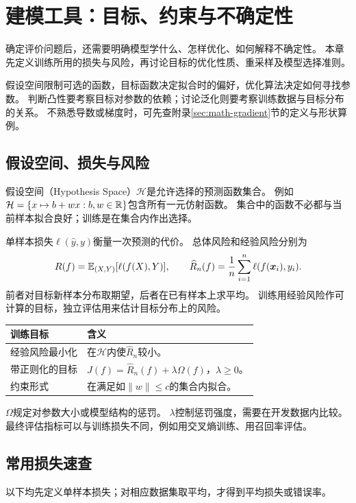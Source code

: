 \chapter{建模工具：目标、约束与不确定性}
\label{ch:tools}

确定评价问题后，还需要明确模型学什么、怎样优化、如何解释不确定性。
本章先定义训练所用的损失与风险，再讨论目标的优化性质、重采样及模型选择准则。

\begin{keyidea}[三个层次]
假设空间限制可选的函数，目标函数决定拟合时的偏好，优化算法决定如何寻找参数。
判断凸性要考察目标对参数的依赖；讨论泛化则要考察训练数据与目标分布的关系。
不熟悉导数或梯度时，可先查附录\ref{sec:math-gradient}节的定义与形状算例。
\end{keyidea}

\section{假设空间、损失与风险}
\label{sec:tools-risk}
假设空间（Hypothesis Space）$\mathcal H$是允许选择的预测函数集合。
例如$\mathcal H=\{x\mapsto b+wx:b,w\in\mathbb{R}\}$包含所有一元仿射函数。
集合中的函数不必都与当前样本拟合良好；训练是在集合内作出选择。

单样本损失$\ell(\hat y,y)$衡量一次预测的代价。
总体风险和经验风险分别为
\[
 R(f)=\mathbb E_{(X,Y)}[\ell(f(X),Y)],\qquad
 \widehat R_n(f)=\frac1n\sum_{i=1}^n\ell(f(\boldsymbol{x}_i),y_i).
\]
前者对目标新样本分布取期望，后者在已有样本上求平均。
训练用经验风险作可计算的目标，独立评估用来估计目标分布上的风险。

\begin{center}
\begin{tabularx}{\textwidth}{P{33mm}Y}
\toprule
训练目标 & 含义\\
\midrule
经验风险最小化 & 在$\mathcal H$内使$\widehat R_n$较小。\\
带正则化的目标 & $J(f)=\widehat R_n(f)+\lambda\Omega(f)$，$\lambda\geq0$。\\
约束形式 & 在满足如$\lVert w\rVert\leq c$的集合内拟合。\\
\bottomrule
\end{tabularx}
\end{center}

$\Omega$规定对参数大小或模型结构的惩罚。
$\lambda$控制惩罚强度，需要在开发数据内比较。
最终评估指标可以与训练损失不同，例如用交叉熵训练、用召回率评估。

\section{常用损失速查}
\label{sec:tools-losses}
以下均先定义单样本损失；对相应数据集取平均，才得到平均损失或错误率。

